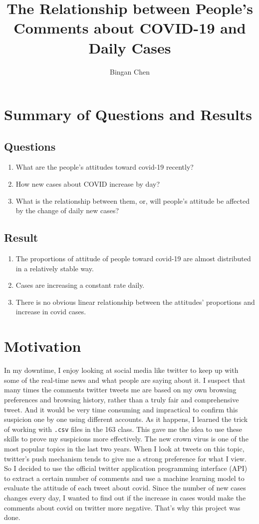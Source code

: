 \documentclass[a4paper, 12pt]{article}
\title{The Relationship between People's Comments about COVID-19 and Daily Cases}
\author{Bingan Chen}
\begin{document}
\doublespacing

\maketitle

\section*{Summary of Questions and Results}
\subsection*{Questions}
\begin{enumerate}
    \item What are the people's attitudes toward covid-19 recently?
    \item How new cases about COVID increase by day?
    \item What is the relationship between them, or, will people’s attitude be affected by the change of daily new cases?
\end{enumerate}
\subsection*{Result}
\begin{enumerate}
    \item The proportions of attitude of people toward covid-19 are almost distributed in a relatively stable way.
    \item Cases are increasing a constant rate daily.
    \item There is no obvious linear relationship between the attitudes' proportions and increase in covid cases.
\end{enumerate}

\section*{Motivation}
In my downtime, I enjoy looking at social media like twitter to keep up with some of the real-time news and what people are saying about it. I suspect that many times the comments twitter tweets me are based on my own browsing preferences and browsing history, rather than a truly fair and comprehensive tweet. And it would be very time consuming and impractical to confirm this suspicion one by one using different accounts. As it happens, I learned the trick of working with \texttt{.csv} files in the 163 class. This gave me the idea to use these skills to prove my suspicions more effectively. The new crown virus is one of the most popular topics in the last two years. When I look at tweets on this topic, twitter's push mechanism tends to give me a strong preference for what I view. So I decided to use the official twitter application programming interface (API) to extract a certain number of comments and use a machine learning model to evaluate the attitude of each tweet about covid. Since the number of new cases changes every day, I wanted to find out if the increase in cases would make the comments about covid on twitter more negative. That's why this project was done.
\end{document}
